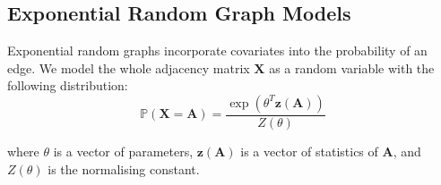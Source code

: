 \documentclass{article}
\begin{document}
\subsection{Exponential Random Graph Models}
Exponential random graphs incorporate covariates into the probability of an edge. We model the whole adjacency matrix $\mathbf{X}$ as a random variable with the following distribution:
\begin{equation*}
    \mathbb{P}(\mathbf{X}=\mathbf{A}) = \frac{\exp(\theta^T \mathbf{z}(\mathbf{A}))}{Z(\theta)}
\end{equation*}

where $\theta$ is a vector of parameters, $\mathbf{z}(\mathbf{A})$ is a vector of statistics of $\mathbf{A}$, and $Z(\theta)$ is the normalising constant. 




\end{document}
